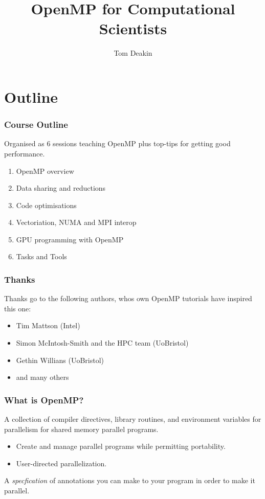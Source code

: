 \documentclass{beamer}
\author{Tom Deakin}
\title{OpenMP for Computational Scientists}
\begin{document}
\frame{\titlepage}

\section{Outline}
\begin{frame}
\frametitle{Course Outline}
Organised as 6 sessions teaching OpenMP plus top-tips for getting good performance.
\begin{enumerate}
  \item OpenMP overview
  \item Data sharing and reductions
  \item Code optimisations
  \item Vectoriation, NUMA and MPI interop
  \item GPU programming with OpenMP
  \item Tasks and Tools
\end{enumerate}
\end{frame}

\begin{frame}
\frametitle{Thanks}
Thanks go to the following authors, whos own OpenMP tutorials have inspired this one:
\begin{itemize}
  \item Tim Mattson (Intel)
  \item Simon McIntosh-Smith and the HPC team (UoBristol)
  \item Gethin Willians (UoBristol)
  \item and many others
\end{itemize}
\end{frame}

\begin{frame}
\frametitle{What is OpenMP?}

A collection of compiler directives, library routines, and environment variables for parallelism for shared memory parallel programs.

\begin{itemize}
  \item Create and manage parallel programs while permitting portability.
  \item User-directed parallelization.
\end{itemize}

A \emph{specfication} of annotations you can make to your program in order to make it parallel.

\end{frame}
\end{document}
